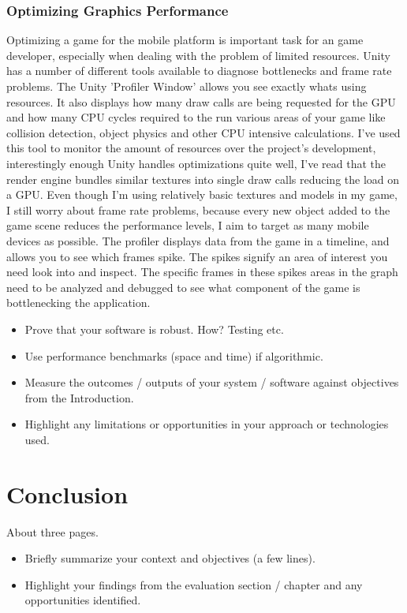 \subsection{Optimizing Graphics Performance}
Optimizing a game for the mobile platform is important task for an game developer, especially when dealing with the problem of limited resources.
Unity has a number of different tools available to diagnose bottlenecks and frame rate problems. The Unity 'Profiler Window' allows you see exactly whats using resources. It also displays how many draw calls are being requested for the GPU and how many CPU cycles required to the run various areas of your game like collision detection, object physics and other CPU intensive calculations. I've used this tool to monitor the amount of resources over the project's development, interestingly enough Unity handles optimizations quite well, I've read that the render engine bundles similar textures into single draw calls reducing the load on a GPU. Even though I'm using relatively basic textures and models in my game, I still worry about frame rate problems, because every new object added to the game scene reduces the performance levels, I aim to target as many mobile devices as possible. The profiler displays data from the game in a timeline, and allows you to see which frames spike. The spikes signify an area of interest you need look into and inspect. The specific frames in these spikes areas in the graph need to be analyzed and debugged to see what component of the game is bottlenecking the application.

\begin{itemize}
\item Prove that your software is robust. How? Testing etc. 
\item Use performance benchmarks (space and time) if algorithmic.
\item Measure the outcomes / outputs of your system / software against objectives from the Introduction.
\item Highlight any limitations or opportunities in your approach or technologies used.
\end{itemize}

\chapter{Conclusion}
About three pages.

\begin{itemize}
\item Briefly summarize your context and objectives (a few lines).
\item Highlight your findings from the evaluation section / chapter and any opportunities identified.
\end{itemize}

